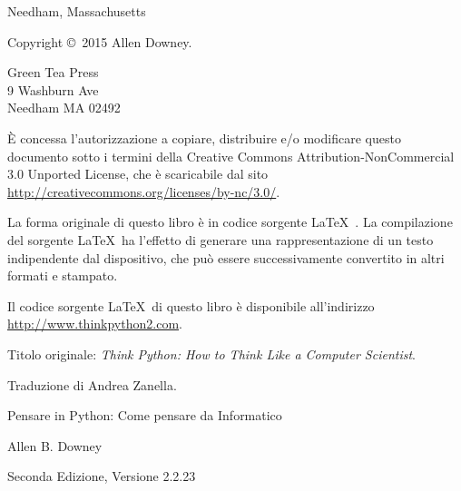 \documentclass[10pt]{book}
\newcommand{\thetitle}{Pensare in Python: Come pensare da Informatico}
\newcommand{\theversion}{Seconda Edizione, Versione 2.2.23}
\newcommand{\thedate}{}
\begin{document}
\begin{latexonly}
\begin{flushright}
{\small Needham, Massachusetts}

\vfill

\end{flushright}


\pagebreak
\thispagestyle{empty}

{\small
Copyright \copyright ~2015 Allen Downey.


\vspace{0.2in}

\begin{flushleft}
Green Tea Press       \\
9 Washburn Ave        \\
Needham MA 02492
\end{flushleft}

È concessa l'autorizzazione a copiare, distribuire e/o modificare questo documento sotto i termini della Creative Commons Attribution-NonCommercial 3.0 Unported License, che è scaricabile dal sito \url{http://creativecommons.org/licenses/by-nc/3.0/}.

La forma originale di questo libro è in codice sorgente \LaTeX\ . La compilazione del sorgente \LaTeX\ ha l'effetto di generare una rappresentazione di un testo indipendente dal dispositivo, che può essere successivamente convertito in altri formati e stampato.

Il codice sorgente \LaTeX\ di questo libro è disponibile all'indirizzo
\url{http://www.thinkpython2.com}.

\vspace{0.2in}
Titolo originale: {\em Think Python: How to Think Like a Computer Scientist}.

Traduzione di Andrea Zanella.


\vspace{0.2in}

} %

\end{latexonly}



\begin{htmlonly}


{\Large \thetitle}

{\large Allen B. Downey}

\theversion

\thedate

\setcounter{chapter}{-1}

\end{htmlonly}
\end{document}
